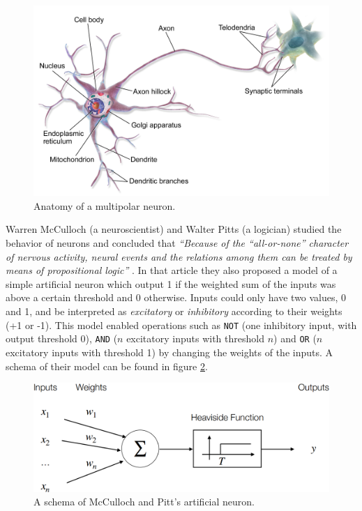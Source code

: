\begin{figure}[hbt]
    \centering
    \includegraphics[scale=0.15]{Images/Chapter 6/multipolar neuron.png}
    \caption{Anatomy of a multipolar neuron.}
    \label{fig:ch6-multipolarneuron}
\end{figure}

Warren McCulloch (a neuroscientist) and Walter Pitts (a logician) studied the behavior of neurons and concluded that \textit{``Because of the ``all-or-none'' character of nervous activity, neural events and the relations among them can be treated by means of propositional logic''} \cite{MCCULLOCH199099}. In that article they also proposed a model of a simple artificial neuron which output 1 if the weighted sum of the inputs was above a certain threshold and 0 otherwise. Inputs could only have two values, 0 and 1, and be interpreted as \textit{excitatory} or \textit{inhibitory} according to their weights (+1 or -1). This model enabled operations such as \texttt{NOT} (one inhibitory input, with output threshold 0), \texttt{AND} ($n$ excitatory inputs with threshold $n$) and \texttt{OR} ($n$ excitatory inputs with threshold 1) by changing the weights of the inputs. A schema of their model can be found in figure \ref{fig:ch6-mccullochpittsartificialneuron}.

\begin{figure}
    \centering
    \includegraphics[scale=0.35]{Images/Chapter 6/mcculloch-pitts neuron.png}
    \caption{A schema of McCulloch and Pitt's artificial neuron.}
    \label{fig:ch6-mccullochpittsartificialneuron}
\end{figure}

